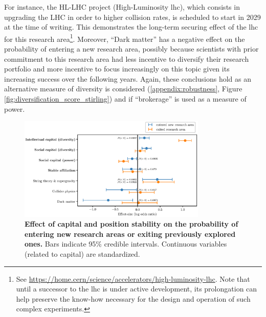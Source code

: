 \documentclass{article}
\begin{document}
For instance, the HL-LHC project (High-Luminosity \gls{lhc}), which consists in upgrading the LHC in order to higher collision rates, is scheduled to start in 2029 at the time of writing. This demonstrates the long-term securing effect of the \gls{lhc} for this research area\footnote{See \url{https://home.cern/science/accelerators/high-luminosity-lhc}. Note that until a successor to the \gls{lhc} is under active development, its prolongation can help preserve the know-how necessary for the design and operation of such complex experiments. }. Moreover, ``Dark matter'' has a negative effect on the probability of entering a new research area, possibly because scientists with prior commitment to this research area had less incentive to diversify their research portfolio and more incentive to focus increasingly on this topic given its increasing success over the following years. Again, these conclusions hold as an alternative measure of diversity is considered (\ref{appendix:robustness}, Figure \ref{fig:diversification_score_stirling}) and if ``brokerage'' is used as a measure of power.
 

\begin{figure}[h]
    \centering
    \includegraphics[width=0.8\textwidth]{plots/exited_score_effects_entropy.eps}
    \caption{\textbf{Effect of capital and position stability on the probability of entering new research areas or exiting previously explored ones.} Bars indicate 95\% credible intervals. Continuous variables (related to capital) are standardized.}
    \label{fig:diversification_score_effect}
\end{figure}
\end{document}
